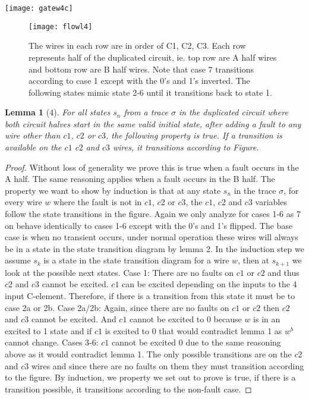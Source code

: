 \documentclass{article}
\newtheorem*{lemma}{Lemma}
\begin{document}
\texttt{[image: gatew4c]}\newline
\begin{figure}
  \centering
    \texttt{[image: flowl4]}
  \caption{The wires in each row are in order of C1, C2, C3.  Each row represents half of the duplicated circuit, ie. top row are A half wires and bottom row are B half wires.  Note that case 7 transitions according to case 1 except with the 0's and 1's inverted.  The following states mimic state 2-6 until it transitions back to state 1.}
\end{figure}

\begin{lemma}[4]
For all states $s_n$ from a trace $\sigma$ in the duplicated circuit where both circuit halves start in the same valid initial state, after adding a fault to any wire other than $c1$, $c2$ or $c3$, the following property is true.  If a transition is available on the $c1$ $c2$ and $c3$ wires, it transitions according to Figure.
\end{lemma}
\begin{proof}
Without loss of generality we prove this is true when a fault occurs in the A half.  The same reasoning applies when a fault occurs in the B half.  The property we want to show by induction is that at any state $s_n$ in the trace $\sigma$, for every wire $w$ where the fault is not in $c1$, $c2$ or $c3$, the $c1$, $c2$ and $c3$ variables follow the state transitions in the figure.  Again we only analyze for cases 1-6 as 7 on behave identically to cases 1-6 except with the 0's and 1's flipped.\newline
The base case is when no transient occurs, under normal operation these wires will always be in a state in the state transition diagram by lemma 2. \newline
In the induction step we assume $s_k$ is a state in the state transition diagram for a wire $w$, then at $s_{k+1}$ we look at the possible next states.  \newline
Case 1:  There are no faults on $c1$ or $c2$ and thus $c2$ and $c3$ cannot be excited.  $c1$ can be excited depending on the inputs to the 4 input C-element.  Therefore, if there is a transition from this state it must be to case 2a or 2b.\newline
Case 2a/2b:  Again, since there are no faults on $c1$ or $c2$ then $c2$ and $c3$ cannot be excited.  And $c1$ cannot be excited to 0 because $w$ is in an excited to 1 state and if $c1$ is excited to 0 that would contradict lemma 1 as $w^b$ cannot change.\newline
Cases 3-6:  $c1$ cannot be excited 0 due to the same reasoning above as it would contradict lemma 1.  The only possible transitions are on the $c2$ and $c3$ wires and since there are no faults on them they must transition according to the figure.
\newline
By induction, we property we set out to prove is true, if there is a transition possible, it transitions according to the non-fault case.
\end{proof}
\end{document}
